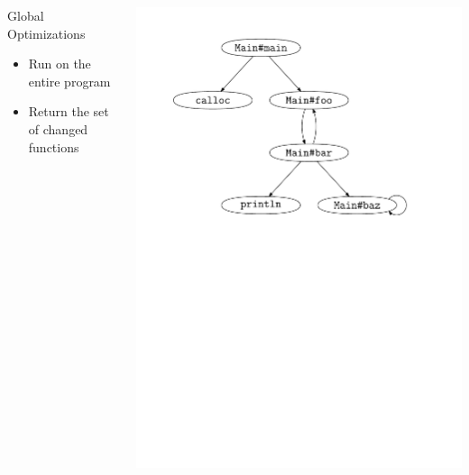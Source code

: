 \documentclass[navbaroff,en]{sdqbeamer}
\begin{document}
\begin{frame}
\begin{columns}
\begin{column}{0.48\textwidth}
			\begin{contentblock}{Global Optimizations}
				\begin{itemize}
					\item Run on the entire program
					\item Return the set of changed functions
				\end{itemize}
			\end{contentblock}
		\end{column}
		\begin{column}{0.48\textwidth}
			\centering
			\includegraphics[scale=0.4]{images/call-graph.ipe.pdf}
		\end{column}
	\end{columns}

\end{frame}
\end{document}
